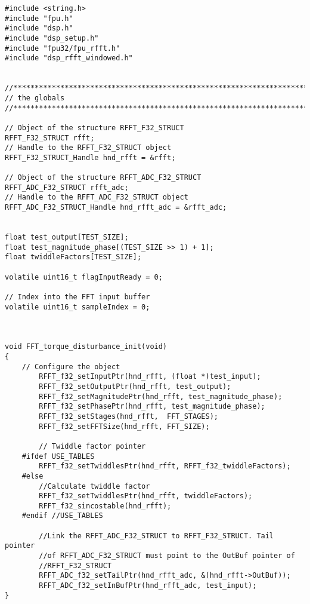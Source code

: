\begin{lstlisting}[caption=\raggedright{mcu-libs/RLS.h}, frame=single]
#include <string.h>
#include "fpu.h"
#include "dsp.h"
#include "dsp_setup.h"
#include "fpu32/fpu_rfft.h"
#include "dsp_rfft_windowed.h"


//*****************************************************************************
// the globals
//*****************************************************************************

// Object of the structure RFFT_F32_STRUCT
RFFT_F32_STRUCT rfft;
// Handle to the RFFT_F32_STRUCT object
RFFT_F32_STRUCT_Handle hnd_rfft = &rfft;

// Object of the structure RFFT_ADC_F32_STRUCT
RFFT_ADC_F32_STRUCT rfft_adc;
// Handle to the RFFT_ADC_F32_STRUCT object
RFFT_ADC_F32_STRUCT_Handle hnd_rfft_adc = &rfft_adc;


float test_output[TEST_SIZE];
float test_magnitude_phase[(TEST_SIZE >> 1) + 1];
float twiddleFactors[TEST_SIZE];

volatile uint16_t flagInputReady = 0;

// Index into the FFT input buffer
volatile uint16_t sampleIndex = 0;



void FFT_torque_disturbance_init(void)
{
    // Configure the object
        RFFT_f32_setInputPtr(hnd_rfft, (float *)test_input);
        RFFT_f32_setOutputPtr(hnd_rfft, test_output);
        RFFT_f32_setMagnitudePtr(hnd_rfft, test_magnitude_phase);
        RFFT_f32_setPhasePtr(hnd_rfft, test_magnitude_phase);
        RFFT_f32_setStages(hnd_rfft,  FFT_STAGES);
        RFFT_f32_setFFTSize(hnd_rfft, FFT_SIZE);

        // Twiddle factor pointer
    #ifdef USE_TABLES
        RFFT_f32_setTwiddlesPtr(hnd_rfft, RFFT_f32_twiddleFactors);
    #else
        //Calculate twiddle factor
        RFFT_f32_setTwiddlesPtr(hnd_rfft, twiddleFactors);
        RFFT_f32_sincostable(hnd_rfft);
    #endif //USE_TABLES

        //Link the RFFT_ADC_F32_STRUCT to RFFT_F32_STRUCT. Tail pointer
        //of RFFT_ADC_F32_STRUCT must point to the OutBuf pointer of
        //RFFT_F32_STRUCT
        RFFT_ADC_f32_setTailPtr(hnd_rfft_adc, &(hnd_rfft->OutBuf));
        RFFT_ADC_f32_setInBufPtr(hnd_rfft_adc, test_input);
}

\end{lstlisting}
